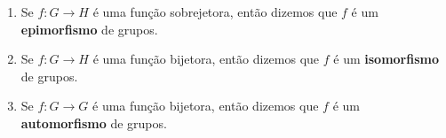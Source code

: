 \documentclass{beamer}
\begin{document}
    \begin{frame}
        \begin{observacao}
            \vspace{.5cm}

            \begin{enumerate}[label={\arabic*})]
                \conti
                \item Se $f : G \to H$ é uma função sobrejetora, \pause então dizemos que $f$ é um \textbf{epimorfismo} de grupos.\pause

                \vspace{.5cm}

                \item Se $f : G \to H$ é uma função bijetora, \pause então dizemos que $f$ é um \textbf{isomorfismo} de grupos.\pause

                \vspace{.5cm}

                \item Se $f : G \to G$ é uma função bijetora, \pause então dizemos que $f$ é um \textbf{automorfismo} de grupos.

                \vspace{.5cm}

            \end{enumerate}
        \end{observacao}
    \end{frame}
\end{document}
